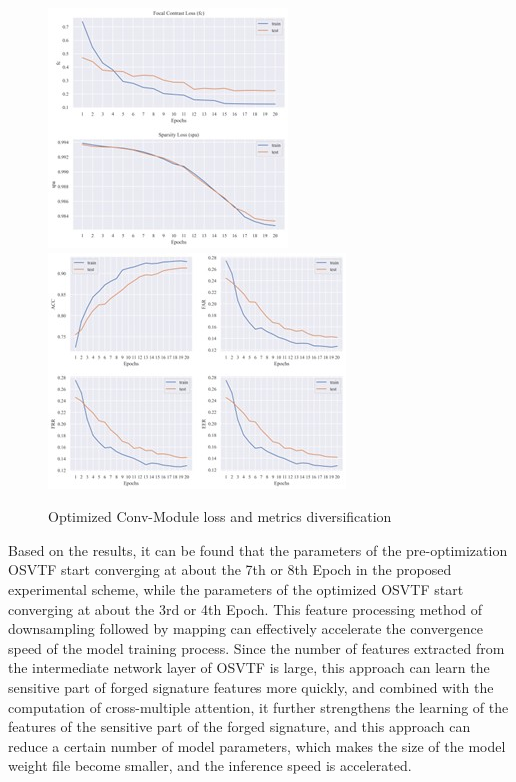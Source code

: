 \begin{figure}[H]
\centering
\includegraphics[scale=1]{figure/afloss.jpg}
\includegraphics[scale=1]{figure/afmetrics.jpg}
\caption{Optimized Conv-Module loss and metrics diversification}
\label{fig:afloss}
\end{figure}

Based on the results, it can be found that the parameters of the pre-optimization OSVTF start converging at about the 7th or 8th Epoch in the proposed experimental scheme, while the parameters of the optimized OSVTF start converging at about the 3rd or 4th Epoch. This feature processing method of downsampling followed by mapping can effectively accelerate the convergence speed of the model training process. Since the number of features extracted from the intermediate network layer of OSVTF is large, this approach can learn the sensitive part of forged signature features more quickly, and combined with the computation of cross-multiple attention, it further strengthens the learning of the features of the sensitive part of the forged signature, and this approach can reduce a certain number of model parameters, which makes the size of the model weight file become smaller, and the inference speed is accelerated.








